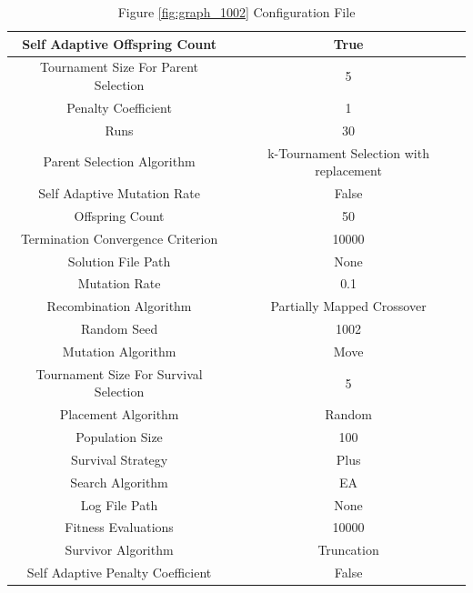 \documentclass{standalone}
\begin{document}
\begin{table}[!htb]
	\centering
	\caption{Figure \ref{fig:graph_1002} Configuration File}
	\label{tab:graph_1002}
	\begin{tabular}{| c | c |}
		\hline
		Self Adaptive Offspring Count		& True		 \\
		\hline
		Tournament Size For Parent Selection		& 5		 \\
		\hline
		Penalty Coefficient		& 1		 \\
		\hline
		Runs		& 30		 \\
		\hline
		Parent Selection Algorithm		& k-Tournament Selection with replacement		 \\
		\hline
		Self Adaptive Mutation Rate		& False		 \\
		\hline
		Offspring Count		& 50		 \\
		\hline
		Termination Convergence Criterion		& 10000		 \\
		\hline
		Solution File Path		& None		 \\
		\hline
		Mutation Rate		& 0.1		 \\
		\hline
		Recombination Algorithm		& Partially Mapped Crossover		 \\
		\hline
		Random Seed		& 1002		 \\
		\hline
		Mutation Algorithm		& Move		 \\
		\hline
		Tournament Size For Survival Selection		& 5		 \\
		\hline
		Placement Algorithm		& Random		 \\
		\hline
		Population Size		& 100		 \\
		\hline
		Survival Strategy		& Plus		 \\
		\hline
		Search Algorithm		& EA		 \\
		\hline
		Log File Path		& None		 \\
		\hline
		Fitness Evaluations		& 10000		 \\
		\hline
		Survivor Algorithm		& Truncation		 \\
		\hline
		Self Adaptive Penalty Coefficient		& False		 \\
		\hline
	\end{tabular}
\end{table}
\end{document}
